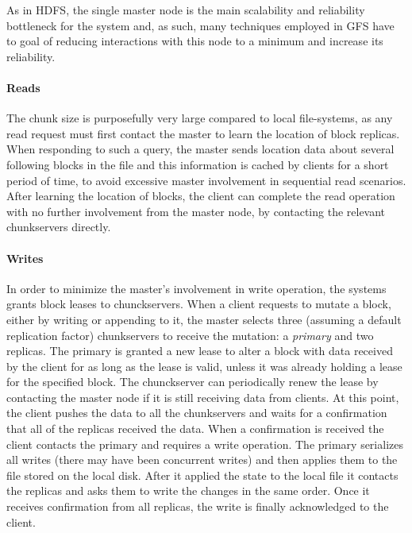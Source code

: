 As in HDFS, the single master node is the main scalability and reliability bottleneck for the system and, as such, many techniques employed in GFS have to goal of reducing interactions with this node to a minimum and increase its reliability.
\paragraph{Reads} The chunk size is purposefully very large compared to local file-systems, as any read request must first contact the master to learn the location of block replicas.
When responding to such a query, the master sends location data about several following blocks in the file and this information is cached by clients for a short period of time, to avoid excessive master involvement in sequential read scenarios.
After learning the location of blocks, the client can complete the read operation with no further involvement from the master node, by contacting the relevant chunkservers directly.
\paragraph{Writes} In order to minimize the master's involvement in write operation, the systems grants block leases to chunckservers.
When a client requests to mutate a block, either by writing or appending to it, the master selects three (assuming a default replication factor) chunkservers to receive the mutation: a \emph{primary} and two replicas.
The primary is granted a new lease to alter a block with data received by the client for as long as the lease is valid, unless it was already holding a lease for the specified block.
The chunckserver can periodically renew the lease by contacting the master node if it is still receiving data from clients.
At this point, the client pushes the data to all the chunkservers and waits for a confirmation that all of the replicas received the data.
When a confirmation is received the client contacts the primary and requires a write operation.
The primary serializes all writes (there may have been concurrent writes) and then applies them to the file stored on the local disk.
After it applied the state to the local file it contacts the replicas and asks them to write the changes in the same order.
Once it receives confirmation from all replicas, the write is finally acknowledged to the client.
